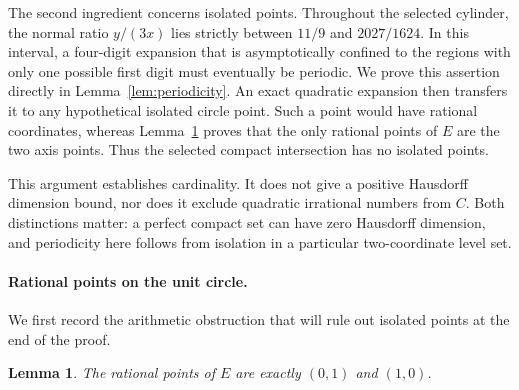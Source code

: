 \documentclass[11pt,a4paper]{amsart}
\numberwithin{equation}{section}
\newtheorem{lemma}[theorem]{Lemma}
\theoremstyle{definition}
\begin{document}
The second ingredient concerns isolated points. Throughout the selected
cylinder, the normal ratio \(y/(3x)\) lies strictly between \(11/9\)
and \(2027/1624\). In this interval, a four-digit expansion that is
asymptotically confined to the regions with only one possible first
digit must eventually be periodic. We prove this assertion directly
in Lemma~\ref{lem:periodicity}. An exact quadratic expansion then transfers
it to any hypothetical isolated circle point.
Such a point would have rational coordinates, whereas
Lemma~\ref{lem:rational} proves that the only rational points of \(E\)
are the two axis points. Thus the selected compact intersection has
no isolated points.

This argument establishes cardinality. It does not give a positive
Hausdorff dimension bound, nor does it exclude quadratic irrational
numbers from \(C\). Both distinctions matter: a perfect compact set
can have zero Hausdorff dimension, and periodicity here follows from
isolation in a particular two-coordinate level set.

\paragraph{Rational points on the unit circle.}\label{sec:rational}

We first record the arithmetic obstruction that will rule out isolated
points at the end of the proof.

\begin{lemma}\label{lem:rational}
The rational points of \(E\) are exactly \((0,1)\) and \((1,0)\).
\end{lemma}
\end{document}
